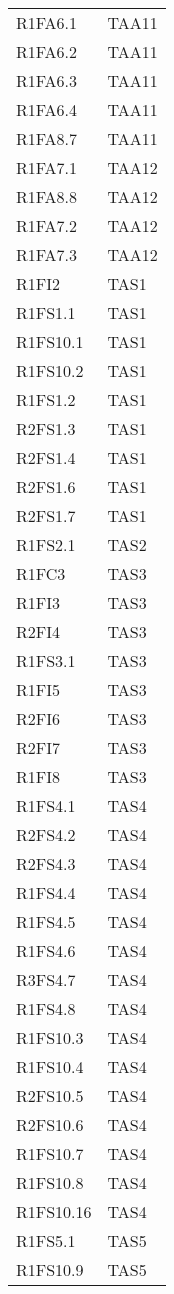 {\begin{longtable}{C{4cm} C{4cm}}
R1FA6.1 & TAA11  \\
R1FA6.2 & TAA11  \\
R1FA6.3 & TAA11  \\
R1FA6.4 & TAA11  \\
R1FA8.7 & TAA11  \\

R1FA7.1 & TAA12  \\
R1FA8.8 & TAA12  \\
R1FA7.2 & TAA12  \\
R1FA7.3 & TAA12  \\

R1FI2 & TAS1 \\
R1FS1.1 & TAS1 \\
R1FS10.1 & TAS1 \\
R1FS10.2 & TAS1 \\
R1FS1.2 & TAS1 \\
R2FS1.3 & TAS1 \\
R2FS1.4 & TAS1 \\
R2FS1.6 & TAS1 \\
R2FS1.7 & TAS1 \\
R1FS2.1 & TAS2 \\
R1FC3 & TAS3 \\
R1FI3 & TAS3 \\
R2FI4 & TAS3 \\
R1FS3.1 & TAS3 \\
R1FI5 & TAS3 \\
R2FI6 & TAS3 \\
R2FI7 & TAS3 \\
R1FI8 & TAS3 \\
R1FS4.1 & TAS4 \\
R2FS4.2 & TAS4 \\
R2FS4.3 & TAS4 \\
R1FS4.4 & TAS4 \\
R1FS4.5 & TAS4 \\
R1FS4.6 & TAS4 \\
R3FS4.7 & TAS4 \\
R1FS4.8 & TAS4 \\
R1FS10.3 & TAS4 \\
R1FS10.4 & TAS4 \\
R2FS10.5 & TAS4 \\
R2FS10.6 & TAS4 \\
R1FS10.7 & TAS4 \\
R1FS10.8 & TAS4 \\
R1FS10.16 & TAS4 \\
R1FS5.1 & TAS5 \\
R1FS10.9 & TAS5 \\

\end{longtable}}
